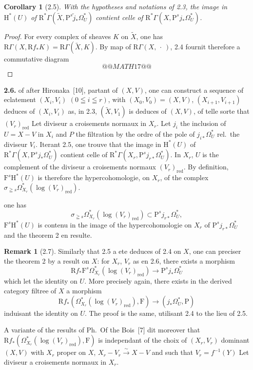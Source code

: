 \documentclass[12pt,a4paper]{article}
\theoremstyle{plain}
\newtheorem{corollary}[theorem]{Corollary}
\theoremstyle{definition}
\newtheorem{remark}[theorem]{Remark}
\begin{document}
\begin{corollary}[2.5]
With the hypotheses and notations of \emph{2.3}, the image in $\mathrm{H}^*(U)$ of $\mathrm{R}^*\Gamma(\tilde{X}, \mathrm{P}^s \tilde{j}_* \Omega_U^*)$ contient celle of $\mathrm{R}^*\Gamma(X, \mathrm{P}^s j_* \Omega_U^*)$.
\end{corollary}

\begin{proof}[Proof]
For every complex of sheaves $K$ on $\tilde{X}$, one has $\mathrm{R}\Gamma(X, \mathrm{R}f_* K) = \mathrm{R}\Gamma(\tilde{X}, K)$. By map of $\mathrm{R}\Gamma(X, \ \cdot\ )$, 2.4 fournit therefore a commutative diagram
\[
@@MATH17@@
\]
\end{proof}

\textbf{2.6.} of after Hironaka~[10], partant of $(X, V)$, one can construct a sequence of eclatement $(X_i, V_i)$ $(0 \leqq i \leqq r)$, with $(X_0, V_0) = (X, V)$, $(X_{i+1}, V_{i+1})$ deduces of $(X_i, V_i)$ as, in 2.3, $(\tilde{X}, V_1)$ is deduces of $(X, V)$, of telle sorte that $(V_r)_{\mathrm{red}}$ Let diviseur a croisements normaux in $X_r$. Let $j_i$ the inclusion of $U = X - V$ in $X_i$ and $P$ the filtration by the ordre of the pole of $j_{i*} \Omega_U^*$ rel.\ the diviseur $V_i$. Iterant 2.5, one trouve that the image in $\mathrm{H}^*(U)$ of $\mathrm{R}^*\Gamma(X, \mathrm{P}^s j_* \Omega_U^*)$ contient celle of $\mathrm{R}^*\Gamma(X_r, \mathrm{P}^s j_{r*} \Omega_U^*)$. In $X_r$, $U$ is the complement of the diviseur a croisements normaux $(V_r)_{\mathrm{red}}$. By definition, $\mathrm{F}^s \mathrm{H}^*(U)$ is therefore the hypercohomologie, on $X_r$, of the complex $\sigma_{\geqq s} \Omega_{X_r}^*(\log (V_r)_{\mathrm{red}})$.

one has
\[
\sigma_{\geqq s} \Omega_{X_r}^*(\log (V_r)_{\mathrm{red}}) \subset \mathrm{P}^s j_{r*} \Omega_U^*,
\]
$\mathrm{F}^s \mathrm{H}^*(U)$ is contenu in the image of the hypercohomologie on $X_r$ of $\mathrm{P}^s j_{r*} \Omega_U^*$ and the theorem 2 en resulte.

\begin{remark}[2.7]
Similarly that 2.5 a ete deduces of 2.4 on $X$, one can preciser the theorem 2 by a result on $X$: for $X_r$, $V_r$ as en 2.6, there exists a morphism
\[
\mathrm{R}f_* \mathrm{F}^s \Omega_{X_r}^*(\log (V_r)_{\mathrm{red}}) \to \mathrm{P}^s j_* \Omega_U^*
\]
which let the identity on $U$. More precisely again, there exists in the derived category filtree of $X$ a morphism
\[
\mathrm{R}f_*(\Omega_{X_r}^*(\log (V_r)_{\mathrm{red}}), \mathrm{F}) \to (j_* \Omega_U^*, \mathrm{P})
\]
induisant the identity on $U$. The proof is the same, utilisant 2.4 to the lieu of 2.5.

A variante of the results of Ph.\ Of the Bois~[7] dit moreover that $\mathrm{R}f_*(\Omega_{X_r}^*(\log (V_r)_{\mathrm{red}}), \mathrm{F})$ is independant of the choix of $(X_r, V_r)$ dominant $(X, V)$ with $X_r$ proper on $X$, $X_r - V_r \xrightarrow{\;\sim\;} X - V$ and such that $V_r = f^{-1}(Y)$ Let diviseur a croisements normaux in $X_r$.
\end{remark}
\end{document}
